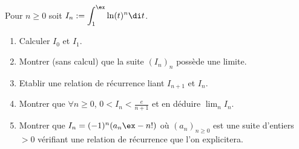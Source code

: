 \exercice[Puissances de $\ln$]

Pour $n \ge 0$ soit $\displaystyle I_n := \int_{1}^{\ex} \ln(t)^n {\di} t$.

\begin{enumerate}

\item Calculer $I_0$ et $I_1$.

\item Montrer (sans calcul) que la suite $(I_n)_n$ possède une limite.

\item Etablir une relation de récurrence liant $I_{n+1}$ et $I_n$.

\item Montrer que $\forall n \ge 0$, $0<I_n<\frac{e}{n+1}$ et en déduire $\lim_n I_n$.

\item Montrer que $I_n = (-1)^n(a_n \ex - n!)$ où $(a_n)_{n \ge 0}$ est une suite d'entiers $>0$ vérifiant une relation de récurrence que l'on explicitera.

\end{enumerate}





